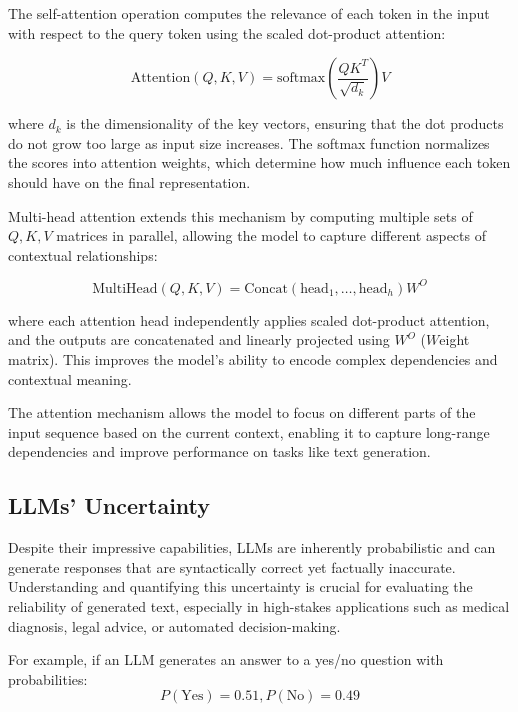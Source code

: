 The self-attention operation computes the relevance of each token in the input
with respect to the query token using the scaled dot-product attention:

\begin{displaymath}
  \mbox{Attention}(Q, K, V) = \mbox{softmax}\left(\frac{QK^{T}}{\sqrt{d_{k}}}\right
  ) V
\end{displaymath}

where $d_{k}$ is the dimensionality of the key vectors, ensuring that the dot
products do not grow too large as input size increases. The softmax function normalizes
the scores into attention weights, which determine how much influence each token
should have on the final representation.

Multi-head attention extends this mechanism by computing multiple sets of
$Q,K,V$ matrices in parallel, allowing the model to capture different aspects of
contextual relationships:

\begin{displaymath}
  \mbox{MultiHead}(Q, K, V) = \mbox{Concat}(\mbox{head}_{1}, \dots, \mbox{head}_{h}
  ) W^{O}
\end{displaymath}

where each attention head independently applies scaled dot-product attention, and
the outputs are concatenated and linearly projected using $W^{O}$ ($W$eight matrix).
This improves the model's ability to encode complex dependencies and contextual meaning.

The attention mechanism allows the model to focus on different parts of the input
sequence based on the current context, enabling it to capture long-range
dependencies and improve performance on tasks like text generation.

\subsection{LLMs' Uncertainty}
\label{sub:llms_uncertainty}

Despite their impressive capabilities, LLMs are inherently probabilistic and can
generate responses that are syntactically correct yet factually inaccurate. Understanding
and quantifying this uncertainty is crucial for evaluating the reliability of generated
text, especially in high-stakes applications such as medical diagnosis, legal advice,
or automated decision-making.

For example, if an LLM generates an answer to a yes/no question with probabilities:
\begin{displaymath}
  P(\mbox{Yes})=0.51,P(\mbox{No})=0.49
\end{displaymath}

